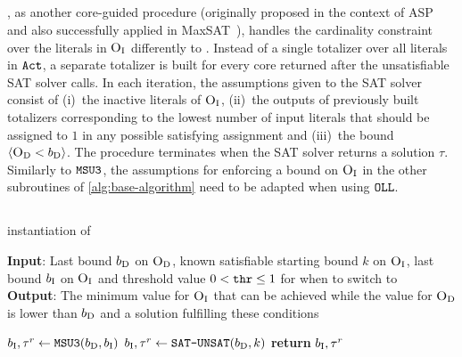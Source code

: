 \subsection{\oll{}\label{sec:oll}}

\oll{}, as another core-guided procedure (originally proposed in the context of ASP~\autocite{DBLP:conf/iclp/AndresKMS12} and also successfully applied in MaxSAT~\autocite{DBLP:conf/cp/MorgadoDM14,DBLP:journals/jsat/IgnatievMM19}), handles the cardinality constraint over the literals in $\textsc{O}_{\text{I}}$ differently to \msu{}.
Instead of a single totalizer over all literals in $\texttt{Act}$, a separate totalizer is built for every core returned after the unsatisfiable SAT solver calls.
In each iteration, the assumptions given to the SAT solver consist of (i)~the inactive literals of $\textsc{O}_{\text{I}}$, (ii)~the outputs of previously built totalizers corresponding to the lowest number of input literals that should be assigned to $1$ in any possible satisfying assignment and (iii)~the bound $\langle \textsc{O}_{\text{D}} < b_{\text{D}} \rangle$.
The procedure terminates when the SAT solver returns a solution $\tau$.
Similarly to $\texttt{MSU3}$, the assumptions for enforcing a bound on $\textsc{O}_{\text{I}}$ in the other subroutines of \cref{alg:base-algorithm} need to be adapted when using $\texttt{OLL}$.

\subsection{\msh{}\label{sec:hybrid}}

\begin{algorithm}[t]
  \caption{\msh{} instantiation of \Min{}}\label{alg:msh}
  \textbf{Input}: Last bound $b_{\text{D}}$ on $\textsc{O}_{\text{D}}$, known satisfiable starting bound $k$ on $\textsc{O}_{\text{I}}$, last bound $b_{\text{I}}$ on $\textsc{O}_{\text{I}}$ and threshold value $0<\texttt{thr}\le 1$ for when to switch to \satunsat{} \\
  \textbf{Output}: The minimum value for $\textsc{O}_{\text{I}}$ that can be achieved while the value for $\textsc{O}_{\text{D}}$ is lower than $b_{\text{D}}$ and a solution fulfilling these conditions

  \begin{algorithmic}[1]
    \IF{$|\Act| < \thr \cdot |\Obj_\inc|$}
      \STATE $b_{\text{I}},\tau^r \gets \texttt{MSU3}{}(b_{\text{D}}, b_{\text{I}})$ 
    \ENDIF
    \IF{$|\Act| \ge \thr \cdot |\Obj_\inc|$}
      \STATE $b_{\text{I}},\tau^r \gets \texttt{SAT-\allowbreak{}UNSAT}{}(b_{\text{D}}, k)$
    \ENDIF
    \STATE \textbf{return} $b_{\text{I}},\tau^r$
  \end{algorithmic}
\end{algorithm}

